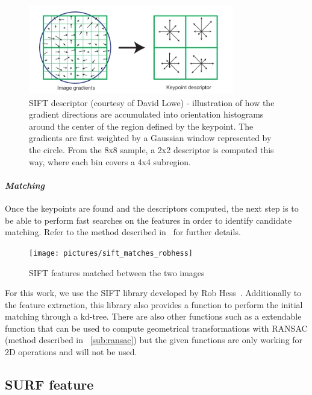 \begin{figure}[h]
\centering
\includegraphics[width=0.8\textwidth]{figures/sift_descriptor}
\caption{SIFT descriptor (courtesy of David Lowe) - illustration of how the gradient directions are accumulated into orientation histograms around the center of the region defined by the keypoint. The gradients are first weighted by a Gaussian window represented by the circle. From the 8x8 sample, a 2x2 descriptor is computed this way, where each bin covers a 4x4 subregion.}
\label{fig:sift_descriptor}
\end{figure}

\clearpage
\paragraph{\emph{Matching}}

Once the keypoints are found and the descriptors computed, the next step is to be able to perform fast searches on the features in order to identify candidate matching. Refer to the method described in~\cite{lowe_2004_sift} for further details.

\begin{figure}[h]
\centering
\texttt{[image: pictures/sift\_matches\_robhess]}
\caption{SIFT features matched between the two images}
\end{figure}

For this work, we use the \gls{SIFT} library developed by Rob Hess~\cite{hess_sift}. Additionally to the feature extraction, this library also provides a function to perform the initial matching through a kd-tree. There are also other functions such as a extendable function that can be used to compute geometrical transformations with \gls{RANSAC} (method described in ~\ref{sub:ransac}) but the given functions are only working for 2D operations and will not be used.

\subsection{SURF feature}

